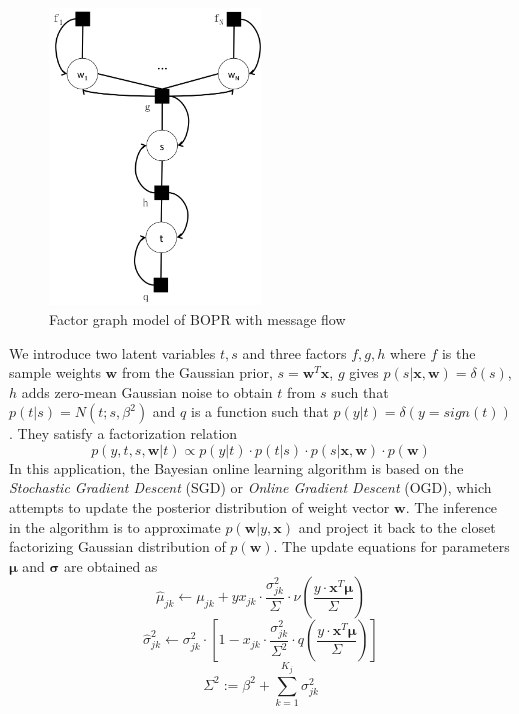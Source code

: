 \begin{figure}[htbp]
\centering
\includegraphics[width=0.5\textwidth]{BOPR.png}
\caption{Factor graph model of BOPR with message flow}
\label{fig:BOPR}
\end{figure}

We introduce two latent variables $t,s$ and three factors $f,g,h$ where $f$ is the sample weights $\mathbf{w}$ from the Gaussian prior, $s=\mathbf{w}^{T}\mathbf{x}$, $g$ gives $p(s|\mathbf{x},\mathbf{w})=\delta (s)$, $h$ adds zero-mean Gaussian noise to obtain $t$ from $s$ such that $p(t|s)=N(t;s,\beta^{2})$ and $q$ is a function such that $p(y|t)=\delta (y=sign (t))$. They satisfy a factorization relation
\begin{equation}
p(y,t,s,\mathbf{w}|t) \propto p(y|t) \cdot p(t|s) \cdot p(s|\mathbf{x},\mathbf{w}) \cdot p(\mathbf{w})
\end{equation}
In this application, the Bayesian online learning algorithm is based on the \emph{Stochastic Gradient Descent} (SGD) or \emph{Online Gradient Descent} (OGD), which attempts to update the posterior distribution of weight vector $\mathbf{w}$. The inference in the algorithm is to approximate $p(\mathbf{w}|y,\mathbf{x})$ and project it back to the closet factorizing Gaussian distribution of $p(\mathbf{w})$. The update equations for parameters $\bm{\mu }$ and $\bm{\sigma }$ are obtained as
\begin{equation}
\hat{\mu }_{{jk}}\leftarrow \mu _{{jk}}+yx_{{jk}}\cdot \frac{\sigma_{{jk}}^{2}}{\Sigma}\cdot \nu (\frac{y \cdot \mathbf{x}^{T}\bm{\mu}}{\Sigma })
\end{equation}
\begin{equation}
\hat{\sigma }^{2}_{{jk}}\leftarrow \sigma ^{2}_{{jk}}\cdot [1-x_{{jk}}\cdot \frac{\sigma_{{jk}}^{2}}{\Sigma ^{2}}\cdot q(\frac{y\cdot \mathbf{x}^{T}\bm{\mu }}{\Sigma })]
\end{equation}
\begin{equation}
\Sigma ^{2} := \beta ^{2}+\sum_{k=1}^{K_{j}}\sigma _{{jk}}^{2}
\end{equation}

